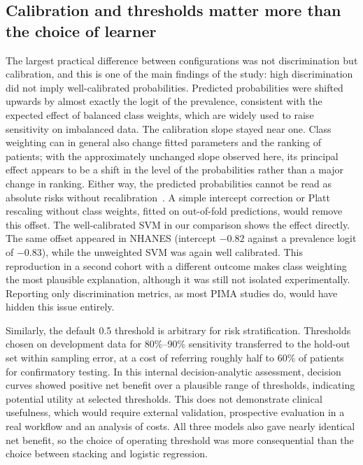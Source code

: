 \subsection{Calibration and thresholds matter more than the choice of learner}
The largest practical difference between configurations was not discrimination but calibration, and this is one of the main findings of the study: high discrimination did not imply well-calibrated probabilities. Predicted probabilities were shifted upwards by almost exactly the logit of the prevalence, consistent with the expected effect of balanced class weights, which are widely used to raise sensitivity on imbalanced data. The calibration slope stayed near one. Class weighting can in general also change fitted parameters and the ranking of patients; with the approximately unchanged slope observed here, its principal effect appears to be a shift in the level of the probabilities rather than a major change in ranking. Either way, the predicted probabilities cannot be read as absolute risks without recalibration~\cite{vancalster2019calibration}. A simple intercept correction or Platt rescaling without class weights, fitted on out-of-fold predictions, would remove this offset. The well-calibrated SVM in our comparison shows the effect directly. The same offset appeared in NHANES (intercept $-0.82$ against a prevalence logit of $-0.83$), while the unweighted SVM was again well calibrated. This reproduction in a second cohort with a different outcome makes class weighting the most plausible explanation, although it was still not isolated experimentally. Reporting only discrimination metrics, as most PIMA studies do, would have hidden this issue entirely.

Similarly, the default 0.5 threshold is arbitrary for risk stratification. Thresholds chosen on development data for 80\%--90\% sensitivity transferred to the hold-out set within sampling error, at a cost of referring roughly half to 60\% of patients for confirmatory testing. In this internal decision-analytic assessment, decision curves showed positive net benefit over a plausible range of thresholds, indicating potential utility at selected thresholds. This does not demonstrate clinical usefulness, which would require external validation, prospective evaluation in a real workflow and an analysis of costs. All three models also gave nearly identical net benefit, so the choice of operating threshold was more consequential than the choice between stacking and logistic regression.



